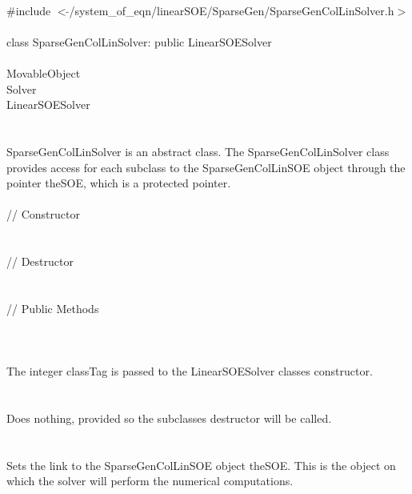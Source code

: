 
   \\
\indent \#include $<\tilde{ }$/system\_of\_eqn/linearSOE/SparseGen/SparseGenColLinSolver.h$>$  \\

  \\
\indent class SparseGenColLinSolver: public LinearSOESolver  \\

 \\
\indent MovableObject \\
\indent\indent  Solver \\
\indent\indent\indent LinearSOESolver \\
\indent\indent\indent{} \\

  \\
\indent SparseGenColLinSolver is an abstract class.  The SparseGenColLinSolver
class provides access for each subclass to the SparseGenColLinSOE object
through the pointer \p theSOE, which is a protected pointer. \\

  \\
\indent\indent // Constructor \\
\indent{}  \\ \\
\indent\indent // Destructor \\
\indent{}\\  \\
\indent\indent // Public Methods \\
\indent{} \\

  \\
  \\
The integer \p classTag is passed to the LinearSOESolver classes
constructor. \\ 

 \\
\\ 
Does nothing, provided so the subclasses destructor will be called. \\

  \\
 \\
Sets the link to the SparseGenColLinSOE object \p theSOE. This is the
object on which the solver will perform the numerical computations. \\




